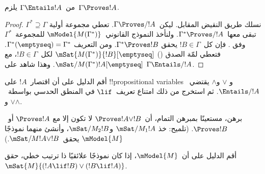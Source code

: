 \documentclass[../../../include/open-logic-section]{subfiles}
\begin{document}


\begin{thm}
  من~$\Gamma \Entails !A$ يلزم~$\Gamma \Proves !A$.
\end{thm}

\begin{proof}
  نسلك طريق النقيض المقابل. ليكن~$\Gamma \Proves/ !A$. تعطي
   مجموعة أولية
  $\Gamma^* \supseteq \Gamma$ تبقى معها~$\Gamma^* \Proves/ !A$. ولنأخذ
  النموذج القانوني~$\mModel{M(\Gamma^*)}$ للمجموعة~$\Gamma^*$ وفق
  . فإن كل~$!B \in \Gamma$ يحقق
  $\Gamma^* \Proves !B$. ومن التعريف
  $\Gamma^*(\emptyseq)=\Gamma^*$. فتعطي لمّة الصدق
  ()
  $\mSat{M(\Gamma^*)}{!B}[\emptyseq]$ لكل~$!B \in \Gamma$، مع
  $\mSat/{M(\Gamma^*)}{!A}[\emptyseq]$. وهذا شاهد على
  $\Gamma \Entails/ !A$.
\end{proof}

\begin{prob}
  أقم الدليل على أن اقتصار~$!A$ على !!{propositional variable}s و
  $\lor$ و$\land$ يقتضي~$\Entails/ !A$. ثم استخرج من ذلك امتناع تعريف~$\lif$
  في المنطق الحدسي بواسطة~$\lor$ و$\land$.
\end{prob}

\begin{prob}
  برهن، مستعينًا بمبرهن التمام، أن~$\Proves !A \lor !B$ لا تكون إلا مع
  $\Proves !A$ أو~$\Proves !B$. (تلميح: خذ
  $\mSat/{M_1}{!A}$ و$\mSat/{M_2}{!B}$، وأنشئ منهما نموذجًا
  $\mModel{M}$ يحقق~$\mSat/{M}{!A \lor !B}$.)
\end{prob}

\begin{prob}
  أقم الدليل على أن~$\mModel{M}$، إذا كان نموذجًا علائقيًا ذا ترتيب خطي،
  حقق~$\mSat{M}{(!A \lif !B)\lor(!B \lif !A)}$.
\end{prob}
\end{document}
